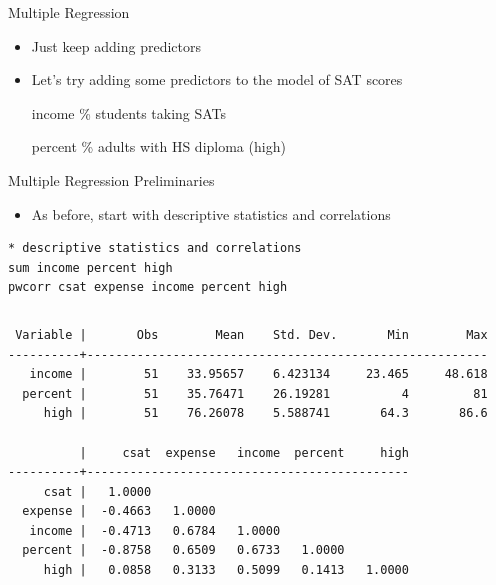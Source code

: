 \documentclass[table,smaller]{beamer}
\begin{document}
\begin{frame}[label=sec-3-1]{Multiple Regression}
\begin{itemize}
\item Just keep adding predictors
\item Let's try adding some predictors to the model of SAT scores
\item[{income}] \% students taking SATs
\item[{percent}] \% adults with HS diploma (high)
\end{itemize}
\end{frame}
\begin{frame}[fragile,label=sec-3-2]{Multiple Regression Preliminaries}
 \begin{itemize}
\item As before, start with descriptive statistics and correlations
\end{itemize}

\begin{verbatim}
* descriptive statistics and correlations
sum income percent high
pwcorr csat expense income percent high
\end{verbatim}


\vspace{-.5em}
\begin{columns}
\begin{block}{}
\begin{verbatim}
 Variable |       Obs        Mean    Std. Dev.       Min        Max
----------+--------------------------------------------------------
   income |        51    33.95657    6.423134     23.465     48.618
  percent |        51    35.76471    26.19281          4         81
     high |        51    76.26078    5.588741       64.3       86.6

          |     csat  expense   income  percent     high
----------+---------------------------------------------
     csat |   1.0000 
  expense |  -0.4663   1.0000 
   income |  -0.4713   0.6784   1.0000 
  percent |  -0.8758   0.6509   0.6733   1.0000 
     high |   0.0858   0.3133   0.5099   0.1413   1.0000
\end{verbatim}
\end{block}
\end{columns}
\vspace{.5em}
\end{frame}
\end{document}
